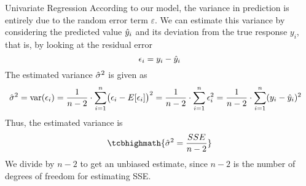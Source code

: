 \begin{frame}{Univariate Regression}
According to our model, the variance in prediction is entirely due to the random error
term $\varepsilon$.
We can estimate this variance by
considering the predicted value $\hat{y}_i$ and its deviation from the
true response $y_i$, that is, by looking at the residual error
\begin{equation*}
    \epsilon_i = y_i - \hat{y}_i
\end{equation*}
%
%
The estimated variance $\hat{\sigma}^2$ is given as
\begin{align*}
    \hat{\sigma}^2 & = \operatorname{var}(\epsilon_i)
    = \frac{1}{n-2} \cdot \sum_{i=1}^n \bigl(\epsilon_i -
    E[\epsilon_i]\bigr)^2
    = \frac{1}{n-2} \cdot \sum_{i=1}^n \epsilon_i^2
    = \frac{1}{n-2} \cdot \sum_{i=1}^n (y_i - \hat{y}_i)^2
\end{align*}
Thus, the estimated variance is
\begin{align}
    \tcbhighmath{
    \hsigma^2 = \frac{SSE}{n-2} }
    \label{eq:reg:eval:sse_est}
\end{align}
We divide by $n-2$ to get an unbiased estimate, 
since $n-2$ is the number of degrees of freedom for
estimating SSE.%
\end{frame}
%
